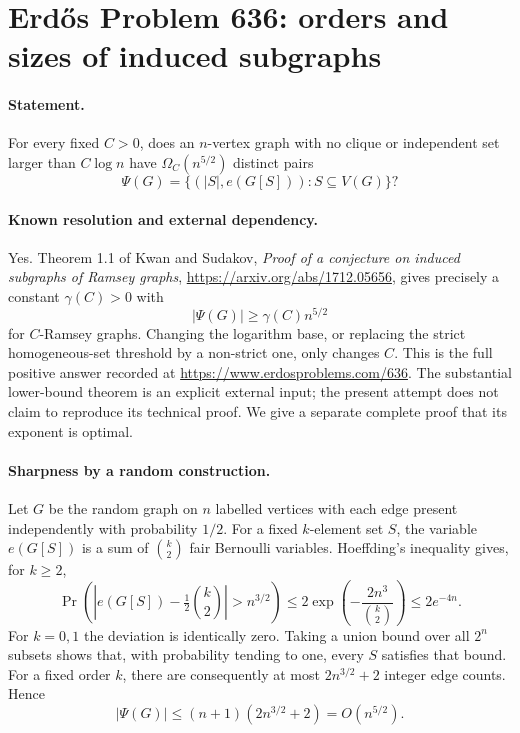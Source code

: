 \section*{Erd\H{o}s Problem 636: orders and sizes of induced subgraphs}

\paragraph{Statement.}
For every fixed \(C>0\), does an \(n\)-vertex graph with no clique or
independent set larger than \(C\log n\) have
\(\Omega_C(n^{5/2})\) distinct pairs
\[
 \Psi(G)=\{(|S|,e(G[S])):S\subseteq V(G)\}?
\]

\paragraph{Known resolution and external dependency.}
Yes. Theorem 1.1 of Kwan and Sudakov,
\emph{Proof of a conjecture on induced subgraphs of Ramsey graphs},
\url{https://arxiv.org/abs/1712.05656}, gives precisely a constant
\(\gamma(C)>0\) with
\[
 |\Psi(G)|\geq\gamma(C)n^{5/2}
\]
for \(C\)-Ramsey graphs. Changing the logarithm base, or replacing
the strict homogeneous-set threshold by a non-strict one, only changes
\(C\). This is the full positive answer recorded at
\url{https://www.erdosproblems.com/636}.
The substantial lower-bound theorem is an explicit external input;
the present attempt does not claim to reproduce its technical proof.
We give a separate complete proof that its exponent is optimal.

\paragraph{Sharpness by a random construction.}
Let \(G\) be the random graph on \(n\) labelled vertices with each edge
present independently with probability \(1/2\).
For a fixed \(k\)-element set \(S\), the variable \(e(G[S])\) is a sum
of \(\binom{k}{2}\) fair Bernoulli variables. Hoeffding's inequality
gives, for \(k\geq2\),
\[
 \Pr\left(\left|e(G[S])-\tfrac12\binom{k}{2}\right|>n^{3/2}\right)
 \leq2\exp\left(-\frac{2n^3}{\binom{k}{2}}\right)
 \leq2e^{-4n}.
\]
For \(k=0,1\) the deviation is identically zero.
Taking a union bound over all \(2^n\) subsets shows that, with
probability tending to one, every \(S\) satisfies that bound.
For a fixed order \(k\), there are consequently at most
\(2n^{3/2}+2\) integer edge counts. Hence
\[
 |\Psi(G)|\leq(n+1)(2n^{3/2}+2)=O(n^{5/2}).
\]

